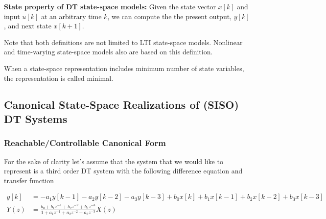 \documentclass[twoside]{article}
\begin{document}
\textbf{State property of DT state-space models:} 
Given the state vector $x[k]$ and input $u[k]$ at an arbitrary time $k$, 
we can compute the the present output, $y[k]$, and next state $x[k+1]$.

Note that both definitions are not limited to LTI state-space models. 
Nonlinear and time-varying state-space models also are based on this 
definition. 

When a state-space representation includes minimum number of state 
variables, the representation is called minimal. 

\subsection*{Canonical State-Space Realizations of (SISO) DT Systems}

\subsubsection*{Reachable/Controllable Canonical Form}

For the sake of clarity let's assume that the system that we would
like to represent is a third order DT system with the following difference equation
and transfer function

\begin{align*}
y[k] &=  -a_1 y[k-1] - a_2 y[k-2] - a_3 y[k-3] 
+ b_0 x[k] + b_1 x[k-1] + b_2 x[k-2] + b_3 x[k-3] \\ 
Y(z) &= \frac{b_0 + b_1 z^{-1} + b_2 z^{-2} + b_3 z^{-3}}{1+ a_1 z^{-1} + a_2 z^{-2} + a_3 z^{-3}} X(z)
\end{align*}
\end{document}
